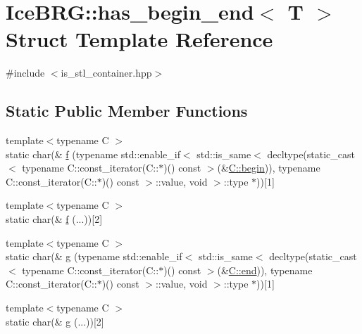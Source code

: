 \hypertarget{structIceBRG_1_1has__begin__end}{}\section{Ice\+B\+R\+G\+:\+:has\+\_\+begin\+\_\+end$<$ T $>$ Struct Template Reference}
\label{structIceBRG_1_1has__begin__end}


{\ttfamily \#include $<$is\+\_\+stl\+\_\+container.\+hpp$>$}

\subsection*{Static Public Member Functions}
\begin{DoxyCompactItemize}
\item 
{\footnotesize template$<$typename C $>$ }\\static char(\& \hyperlink{structIceBRG_1_1has__begin__end_af2c472341ebab0217fdb23cb02ffa10b}{f} (typename std\+::enable\+\_\+if$<$ std\+::is\+\_\+same$<$ decltype(static\+\_\+cast$<$ typename C\+::const\+\_\+iterator(C\+::$\ast$)() const  $>$(\&\hyperlink{Eigen_8hpp_aa9d189cae4a0d465ace0d4979cee3fbe}{C\+::begin})), typename C\+::const\+\_\+iterator(C\+::$\ast$)() const  $>$\+::value, void $>$\+::type $\ast$))\mbox{[}1\mbox{]}
\item 
{\footnotesize template$<$typename C $>$ }\\static char(\& \hyperlink{structIceBRG_1_1has__begin__end_ac994dd248de2afca056d6f4b1f38d724}{f} (...))\mbox{[}2\mbox{]}
\item 
{\footnotesize template$<$typename C $>$ }\\static char(\& \hyperlink{structIceBRG_1_1has__begin__end_a717c7e921029da74f7bae417afcef808}{g} (typename std\+::enable\+\_\+if$<$ std\+::is\+\_\+same$<$ decltype(static\+\_\+cast$<$ typename C\+::const\+\_\+iterator(C\+::$\ast$)() const  $>$(\&\hyperlink{Eigen_8hpp_a0a9525f97eb5ce5a8a5c160844fea001}{C\+::end})), typename C\+::const\+\_\+iterator(C\+::$\ast$)() const  $>$\+::value, void $>$\+::type $\ast$))\mbox{[}1\mbox{]}
\item 
{\footnotesize template$<$typename C $>$ }\\static char(\& \hyperlink{structIceBRG_1_1has__begin__end_a96fd2b646f0b256d9a8a04b38ae0565c}{g} (...))\mbox{[}2\mbox{]}
\end{DoxyCompactItemize}
